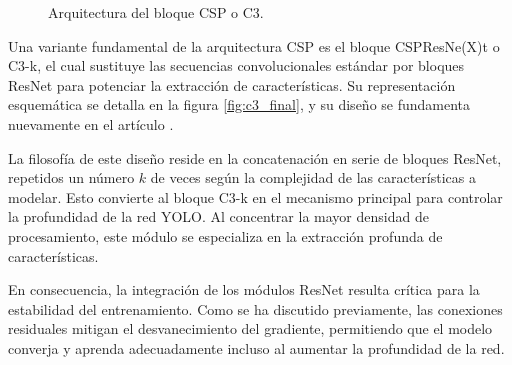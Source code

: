\documentclass{article}
\begin{document}
\begin{figure}[H]
{
		}
		\caption{Arquitectura del bloque CSP o C3.}
		\label{fig:csp_bottleneck}
	\end{figure}
	
Una variante fundamental de la arquitectura CSP es el bloque CSPResNe(X)t o C3-k, el cual sustituye las secuencias convolucionales estándar por bloques ResNet para potenciar la extracción de características. Su representación esquemática se detalla en la figura \ref{fig:c3_final}, y su diseño se fundamenta nuevamente en el artículo \cite{wang2019cspnetnewbackboneenhance}. 

La filosofía de este diseño reside en la concatenación en serie de bloques ResNet, repetidos un número $k$ de veces según la complejidad de las características a modelar. Esto convierte al bloque C3-k en el mecanismo principal para controlar la profundidad de la red YOLO. Al concentrar la mayor densidad de procesamiento, este módulo se especializa en la extracción profunda de características.


En consecuencia, la integración de los módulos ResNet resulta crítica para la estabilidad del entrenamiento. Como se ha discutido previamente, las conexiones residuales mitigan el desvanecimiento del gradiente, permitiendo que el modelo converja y aprenda adecuadamente incluso al aumentar la profundidad de la red. 
\end{document}
